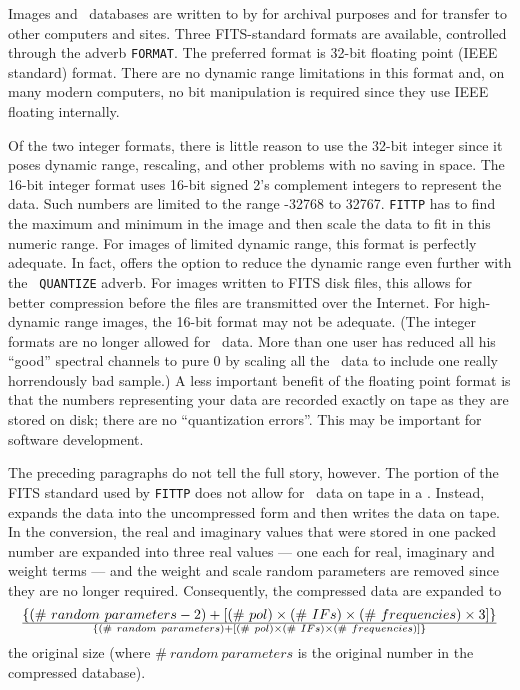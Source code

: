      Images and \uv\ databases are written to  by
{\tt {}} for archival purposes and for transfer to other
computers and sites.  Three FITS-standard formats are available,
controlled through the adverb {\tt FORMAT}.  The preferred format is
32-bit floating point (IEEE standard) format.  There are no dynamic
range limitations in this format and, on many modern computers, no bit
manipulation is required since they use IEEE floating internally.

     Of the two integer formats, there is little reason to use the
32-bit integer since it poses dynamic range, rescaling, and other
problems with no saving in space.  The 16-bit integer format uses
16-bit signed 2's complement integers to represent the data.  Such
numbers are limited to the range -32768 to 32767.  {\tt FITTP} has to
find the maximum and minimum in the image and then scale the data to
fit in this numeric range.  For images of limited dynamic range, this
format is perfectly adequate.  In fact, {\tt {}} offers the
option to reduce the dynamic range even further with the {\tt
QUANTIZE} adverb.  For images written to FITS disk files, this allows
for better compression before the files are transmitted over the
Internet.  For high-dynamic range images, the 16-bit format may not be
adequate. (The integer formats are no longer allowed for \uv\ data.
More than one user has reduced all his ``good'' spectral channels to
pure 0 by scaling all the \uv\ data to include one really horrendously
bad sample.)  A less important benefit of the floating point format is
that the numbers representing your data are recorded exactly on tape
as they are stored on disk; there are no ``quantization errors''.
This may be important for software development.

     The preceding paragraphs do not tell the full story, however.
The portion of the FITS standard used by {\tt FITTP} does not allow
for \uv\ data on tape in a . Instead, {\tt
{}} expands the data into the uncompressed form and then
writes the data on tape.  In the conversion, the real and imaginary
values that were stored in one packed number are expanded into three
real values --- one each for real, imaginary and weight terms --- and
the weight and scale random parameters are removed since they are no
longer required.  Consequently, the compressed data are expanded to
$$
    \lbrace (\#~random~parameters - 2 ) + \lbrack (\#~pol) \times
        (\#~IFs) \times (\#~frequencies) \times 3 \rbrack \rbrace
      \over
     \lbrace (\#~random~parameters) + \lbrack (\#~pol) \times (\#~IFs)
       \times (\#~frequencies) \rbrack \rbrace
$$
the original size  (where $\#~random~parameters$ is the original
number in the compressed database).

